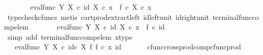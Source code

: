 \begin{isabellebody}
\ \ \isamarkupfalse%
\ \isamarkupfalse%
\ {\isachardoublequoteopen}{\isachardot}{\kern0pt}{\isachardot}{\kern0pt}{\isachardot}{\kern0pt}\ {\isacharequal}{\kern0pt}\ eval{\isacharunderscore}{\kern0pt}func\ Y\ X\ {\isasymcirc}\isactrlsub c\ {\isasymlangle}id\ X\ {\isasymcirc}\isactrlsub c\ x\ {\isacharcomma}{\kern0pt}\ f\ {\isasymcirc}\isactrlsub c\ {\isacharparenleft}{\kern0pt}{\isasymbeta}\isactrlbsub X\isactrlesub \ {\isasymcirc}\isactrlsub c\ x{\isacharparenright}{\kern0pt}{\isasymrangle}{\isachardoublequoteclose}\isanewline
\ \ \ \ \isamarkupfalse%
\ {\isacharparenleft}{\kern0pt}typecheck{\isacharunderscore}{\kern0pt}cfuncs{\isacharcomma}{\kern0pt}\ metis\ cart{\isacharunderscore}{\kern0pt}prod{\isacharunderscore}{\kern0pt}extract{\isacharunderscore}{\kern0pt}left\ id{\isacharunderscore}{\kern0pt}left{\isacharunderscore}{\kern0pt}unit{}\ id{\isacharunderscore}{\kern0pt}right{\isacharunderscore}{\kern0pt}unit{}\ terminal{\isacharunderscore}{\kern0pt}func{\isacharunderscore}{\kern0pt}comp{\isacharunderscore}{\kern0pt}elem{\isacharparenright}{\kern0pt}\isanewline
\ \ \isamarkupfalse%
\ \isamarkupfalse%
\ {\isachardoublequoteopen}{\isachardot}{\kern0pt}{\isachardot}{\kern0pt}{\isachardot}{\kern0pt}\ {\isacharequal}{\kern0pt}\ eval{\isacharunderscore}{\kern0pt}func\ Y\ X\ {\isasymcirc}\isactrlsub c\ {\isasymlangle}id\ X\ {\isasymcirc}\isactrlsub c\ x\ {\isacharcomma}{\kern0pt}\ f\ {\isasymcirc}\isactrlsub c\ id\ {\isasymone}{\isasymrangle}{\isachardoublequoteclose}\isanewline
\ \ \ \ \isamarkupfalse%
\ {\isacharparenleft}{\kern0pt}simp\ add{\isacharcolon}{\kern0pt}\ terminal{\isacharunderscore}{\kern0pt}func{\isacharunderscore}{\kern0pt}comp{\isacharunderscore}{\kern0pt}elem\ x{\isacharunderscore}{\kern0pt}type{\isacharparenright}{\kern0pt}\isanewline
\ \ \isamarkupfalse%
\ \isamarkupfalse%
\ {\isachardoublequoteopen}{\isachardot}{\kern0pt}{\isachardot}{\kern0pt}{\isachardot}{\kern0pt}\ {\isacharequal}{\kern0pt}\ eval{\isacharunderscore}{\kern0pt}func\ Y\ X\ {\isasymcirc}\isactrlsub c\ {\isacharparenleft}{\kern0pt}id\isactrlsub c\ X\ {\isasymtimes}\isactrlsub f\ f{\isacharparenright}{\kern0pt}\ {\isasymcirc}\isactrlsub c\ {\isasymlangle}x{\isacharcomma}{\kern0pt}\ id\ {\isasymone}{\isasymrangle}{\isachardoublequoteclose}\isanewline
\ \ \ \ \isamarkupfalse%
\ cfunc{\isacharunderscore}{\kern0pt}cross{\isacharunderscore}{\kern0pt}prod{\isacharunderscore}{\kern0pt}comp{\isacharunderscore}{\kern0pt}cfunc{\isacharunderscore}{\kern0pt}prod\ \isamarkupfalse%

\end{isabellebody}
